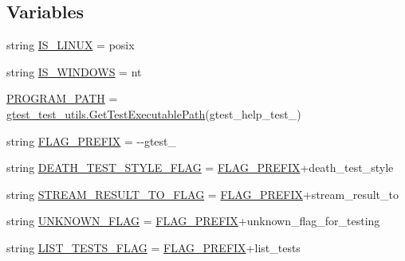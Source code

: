 \subsection*{Variables}
\begin{DoxyCompactItemize}
\item 
string \hyperlink{namespacegtest__help__test_ae61a149d50be253176a139fbe6712582}{I\+S\+\_\+\+L\+I\+N\+UX} = \textquotesingle{}posix\textquotesingle{}
\item 
string \hyperlink{namespacegtest__help__test_a0f8d4b00fc83b1e72bbb5eca5f3bc4d7}{I\+S\+\_\+\+W\+I\+N\+D\+O\+WS} = \textquotesingle{}nt\textquotesingle{}
\item 
\hyperlink{namespacegtest__help__test_a52878eacdd3a1534fa4743e7d134066c}{P\+R\+O\+G\+R\+A\+M\+\_\+\+P\+A\+TH} = \hyperlink{namespacegtest__test__utils_a89ed3717984a80ffbb7a9c92f71b86a2}{gtest\+\_\+test\+\_\+utils.\+Get\+Test\+Executable\+Path}(\textquotesingle{}gtest\+\_\+help\+\_\+test\+\_\+\textquotesingle{})
\item 
string \hyperlink{namespacegtest__help__test_a9e357a76dd993057c826ec411c9a4b3c}{F\+L\+A\+G\+\_\+\+P\+R\+E\+F\+IX} = \textquotesingle{}-\/-\/gtest\+\_\+\textquotesingle{}
\item 
string \hyperlink{namespacegtest__help__test_a322bbb8bf27d7701c76fb5704a1fda1f}{D\+E\+A\+T\+H\+\_\+\+T\+E\+S\+T\+\_\+\+S\+T\+Y\+L\+E\+\_\+\+F\+L\+AG} = \hyperlink{namespacegtest__help__test_a9e357a76dd993057c826ec411c9a4b3c}{F\+L\+A\+G\+\_\+\+P\+R\+E\+F\+IX}+\textquotesingle{}death\+\_\+test\+\_\+style\textquotesingle{}
\item 
string \hyperlink{namespacegtest__help__test_a06d67cce3cb57c484c169d1dbe4afd6c}{S\+T\+R\+E\+A\+M\+\_\+\+R\+E\+S\+U\+L\+T\+\_\+\+T\+O\+\_\+\+F\+L\+AG} = \hyperlink{namespacegtest__help__test_a9e357a76dd993057c826ec411c9a4b3c}{F\+L\+A\+G\+\_\+\+P\+R\+E\+F\+IX}+\textquotesingle{}stream\+\_\+result\+\_\+to\textquotesingle{}
\item 
string \hyperlink{namespacegtest__help__test_a400934cf13530098af31e2a65f1a8d84}{U\+N\+K\+N\+O\+W\+N\+\_\+\+F\+L\+AG} = \hyperlink{namespacegtest__help__test_a9e357a76dd993057c826ec411c9a4b3c}{F\+L\+A\+G\+\_\+\+P\+R\+E\+F\+IX}+\textquotesingle{}unknown\+\_\+flag\+\_\+for\+\_\+testing\textquotesingle{}
\item 
string \hyperlink{namespacegtest__help__test_a558dea5edfd6fdb48112401b257f5aea}{L\+I\+S\+T\+\_\+\+T\+E\+S\+T\+S\+\_\+\+F\+L\+AG} = \hyperlink{namespacegtest__help__test_a9e357a76dd993057c826ec411c9a4b3c}{F\+L\+A\+G\+\_\+\+P\+R\+E\+F\+IX}+\textquotesingle{}list\+\_\+tests\textquotesingle{}

\end{DoxyCompactItemize}
